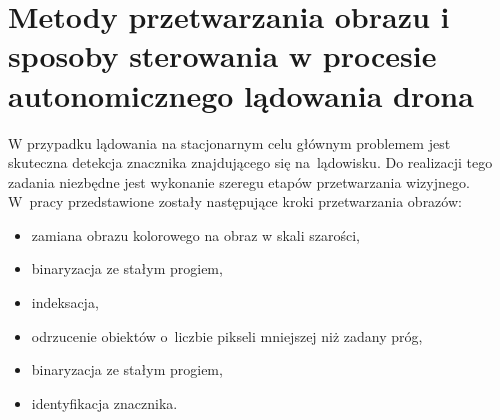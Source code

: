 \chapter{Metody przetwarzania obrazu i sposoby sterowania w procesie autonomicznego lądowania drona}
\label{cha:Metody przetwarzania obrazu i sposoby sterowania w procesie autonomicznego lądowania drona}
W przypadku lądowania na stacjonarnym celu głównym problemem jest skuteczna detekcja znacznika znajdującego się na~lądowisku. Do realizacji tego zadania niezbędne jest wykonanie szeregu etapów przetwarzania wizyjnego. W~pracy \cite{Rings} przedstawione zostały następujące kroki przetwarzania obrazów:
\begin{itemize}
	\item zamiana obrazu kolorowego na obraz w skali szarości,
	\item binaryzacja ze stałym progiem,
	\item indeksacja,
	\item odrzucenie obiektów o~liczbie pikseli mniejszej niż zadany próg,
	\item binaryzacja ze stałym progiem,
	\item identyfikacja znacznika.
\end{itemize}

